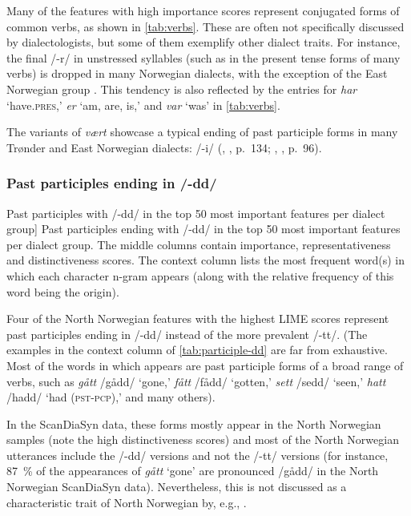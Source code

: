 Many of the features with high importance scores represent conjugated forms of common verbs, as shown in \autoref{tab:verbs}.
These are often not specifically discussed by dialectologists, but some of them exemplify other dialect traits.
For instance, the final /-r/ in unstressed syllables (such as in the present tense forms of many verbs) is dropped in many Norwegian dialects, with the exception of the East Norwegian group \citet[pp.~53, 79, 92, 110]{maehlum2012dialektlandskapet}.
This tendency is also reflected by the entries for \textit{har} `have.\textsc{pres},' \textit{er} `am, are, is,' and \textit{var} `was' in \autoref{tab:verbs}.

The variants of \textit{v\ae{}rt} showcase a typical ending of past participle forms in many Tr\o{}nder and East Norwegian dialects: /-i/ (\citeauthor{dalen1990troendersk}, \citeyear{dalen1990troendersk}, p.~134; \citeauthor{endresen1990vikvaersk}, \citeyear{endresen1990vikvaersk}, p.~96).


\subsubsection{Past participles ending in /-dd/}

\begin{table}[htbp]
    
    \caption
    [Past participles with /-dd/ in the top 50 most important features per dialect group]
    {Past participles ending with /-dd/ in the top 50 most important features per dialect group.
    The middle columns contain importance, representativeness and distinctiveness scores.
    The context column lists the most frequent word(s) in which each character n-gram appears (along with the relative frequency of this word being the origin).}
    \label{tab:participle-dd}
\end{table}

Four of the North Norwegian features with the highest LIME scores represent past participles ending in /-dd/ instead of the more prevalent /-tt/.
(The examples in the context column of \autoref{tab:participle-dd} are far from exhaustive.
Most of the words in which  appears are past participle forms of a broad range of verbs, such as \textit{g\aa{}tt} /g\aa{}dd/ `gone,' \textit{f\aa{}tt} /f\aa{}dd/ `gotten,' \textit{sett} /sedd/ `seen,' \textit{hatt} /hadd/ `had (\textsc{pst-pcp}),' and many others).

In the ScanDiaSyn data, these forms mostly appear in the North Norwegian samples (note the high distinctiveness scores) and most of the North Norwegian utterances include the /-dd/ versions and not the /-tt/ versions (for instance, 87~\% of the appearances of \textit{g\aa{}tt} `gone' are pronounced /g\aa{}dd/ in the North Norwegian ScanDiaSyn data).
Nevertheless, this is not discussed as a characteristic trait of North Norwegian by, e.g., \citet[pp.~109--110]{maehlum2012dialektlandskapet}.
